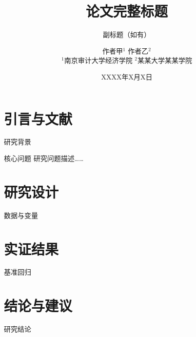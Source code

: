 \documentclass{beamer}
\title[短标题]{论文完整标题}
\subtitle{副标题（如有）}
\author{作者甲$^1$ \quad 作者乙$^2$ \\[4pt]
{\small $^1$南京审计大学经济学院 \quad $^2$某某大学某某学院}}
\date{XXXX年X月X日}
\begin{document}
\maketitle

\section{引言与文献}

\begin{frame}{研究背景}
    \begin{block}{核心问题}
        \small 研究问题描述……
    \end{block}
\end{frame}

\section{研究设计}

\begin{frame}{数据与变量}

\end{frame}

\section{实证结果}

\begin{frame}{基准回归}

\end{frame}

\section{结论与建议}

\begin{frame}{研究结论}

\end{frame}

\QApage
\end{document}
